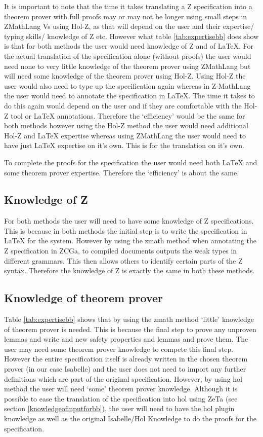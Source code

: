 It is important to note that the time it takes translating a Z specification into 
a theorem prover with full proofs may or may not be longer using small steps in ZMathLang Vs
using Hol-Z, as that will depend on the user and their expertise/ typing skills/
knowledge of Z etc.
However what table \ref{tab:expertisebb} does show is that for both methods the user would
need knowledge of Z and of \LaTeX{}. For the actual translation of the specification alone (without proofs) 
the user would need none to very little knowledge of the theorem prover using ZMathLang but will need some 
knowledge of the theorem prover using Hol-Z.
Using Hol-Z the user would also need to type up the specification again whereas in Z-MathLang the user
would need to annotate the specification in \LaTeX{}. The time it takes to do this again would
depend on the user and if they are comfortable with the Hol-Z tool or \LaTeX{} annotations.
Therefore the `efficiency' would be the same for both methods however using the Hol-Z method the user
would need additional Hol-Z and \LaTeX{} expertise whereas using ZMathLang the user would need to have just \LaTeX{} 
expertise on it's own. This is for the translation on it's own.

To complete the proofs for the specification the user would need both \LaTeX{} and some theorem
prover expertise. Therefore the `efficiency' is about the same.

\subsection{Knowledge of Z}

For both methods the user will need to have some knowledge of Z specifications.
This is because in both methods the initial step is to write the specification
in \LaTeX{} for the system. However by using the \gls{zmath} method when
annotating the Z specification in ZCGa, to compiled documents outputs the weak
types in different grammars. This then allows others to identify certain parts
of the Z syntax. Therefore the knowledge of Z is exactly the same in both these
methods.

\subsection{Knowledge of theorem prover}

Table \ref{tab:expertisebb} shows that by using the \gls{zmath} method `little'
knowledge of theorem prover is needed. This is because the final step to prove
any unproven lemmas and write and new safety properties and lemmas and prove
them. The user may need some theorem prover knowledge to compete this
final step. However the entire specification itself is already written in the
chosen theorem prover (in our case Isabelle) and the user does not need to
import any further definitions which are part of the original specification.
However, by using \gls{hol} method the user will need `some' theorem prover
knowledge. Although it is possible to ease the translation of the specification
into \gls{hol} using ZeTa (see section \ref{knowledgeofinputforbb}), the user
will need to have the \gls{hol} plugin knowledge as well as the original
Isabelle/Hol Knowledge to do the proofs for the specification.


